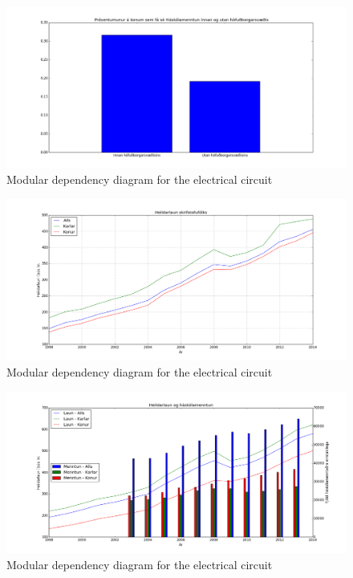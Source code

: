 \documentclass[12pt, svn, draft]{rureport}
\begin{document}
\begin{figure}
	\centering 
	\includegraphics[width=\textwidth]{../graphics/Haskolamentun_konur_innan_utan_hs.png}
	\caption{Modular dependency diagram for the electrical circuit \label{fig:menntunkonur}}
\end{figure}

\begin{figure}
	\centering 
	\includegraphics[width=\textwidth]{../graphics/Heildar_laun.png}
	\caption{Modular dependency diagram for the electrical circuit \label{fig:heildarlaun}}
\end{figure}

\begin{figure}
	\centering 
	\includegraphics[width=\textwidth]{../graphics/Heildar_laun_og_haskolamentun.png}
	\caption{Modular dependency diagram for the electrical circuit \label{fig:heildarhask}}
\end{figure}
\end{document}
